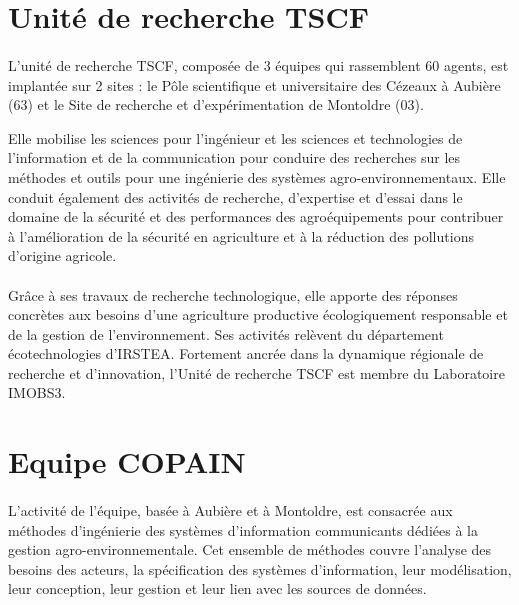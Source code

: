 \section{Unité de recherche TSCF}
\paragraph{}
L’unité de recherche \gls{TSCF}, composée de 3 équipes qui rassemblent 60 agents, est implantée sur 2 sites : le Pôle scientifique et universitaire des Cézeaux à Aubière (63) et le Site de recherche et d’expérimentation de Montoldre (03). 

Elle mobilise les sciences pour l’ingénieur et les sciences et technologies de l’information et de la communication pour conduire des recherches sur les méthodes et outils pour une ingénierie des systèmes agro-environnementaux. 
\newline
Elle conduit également des activités de recherche, d’expertise et d’essai dans le domaine de la sécurité et des performances des agroéquipements pour contribuer à l’amélioration de la sécurité en agriculture et à la réduction des pollutions d’origine agricole. 
\paragraph{}
Grâce à ses travaux de recherche technologique, elle apporte des réponses concrètes aux besoins d’une agriculture productive écologiquement responsable et de la gestion de l’environnement. Ses activités relèvent du département écotechnologies d'IRSTEA. 
\newline
Fortement ancrée dans la dynamique régionale de recherche et d’innovation, l’Unité de recherche TSCF est membre du Laboratoire \gls{IMOBS3}. 

\section{Equipe COPAIN}
\paragraph{}
L’activité de l’équipe, basée à Aubière et à Montoldre, est consacrée aux méthodes d’ingénierie des systèmes d’information communicants dédiées à la gestion agro-environnementale. Cet ensemble de méthodes couvre l’analyse des besoins des acteurs, la spécification des systèmes d’information, leur modélisation, leur conception, leur gestion et leur lien avec les sources de données. 
